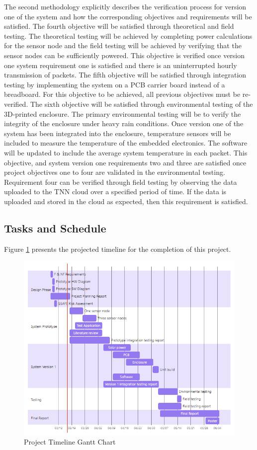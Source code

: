 The second methodology explicitly describes the verification process for version one of the system and how the corresponding objectives and requirements will be satisfied. The fourth objective will be satisfied through theoretical and field testing. The theoretical testing will be achieved by completing power calculations for the sensor node and the field testing will be achieved by verifying that the sensor nodes can be sufficiently powered. This objective is verified once version one system requirement one is satisfied and there is an uninterrupted hourly transmission of packets. The fifth objective will be satisfied through integration testing by implementing the system on a PCB carrier board instead of a breadboard. For this objective to be achieved, all previous objectives must be re-verified. The sixth objective will be satisfied through environmental testing of the 3D-printed enclosure. The primary environmental testing will be to verify the integrity of the enclosure under heavy rain conditions. Once version one of the system has been integrated into the enclosure, temperature sensors will be included to measure the temperature of the embedded electronics. The software will be updated to include the average system temperature in each packet. This objective, and system version one requirements two and three are satisfied once project objectives one to four are validated in the environmental testing. Requirement four can be verified through field testing by observing the data uploaded to the TNN cloud over a specified period of time. If the data is uploaded and stored in the cloud as expected, then this requirement is satisfied. 

\clearpage
\subsection{Tasks and Schedule}
Figure \ref{fig:GanttChart} presents the projected timeline for the completion of this project.

\begin{figure}[h!]
\center
\includegraphics[scale=0.95, angle=90, origin=c]{Images/Gantt-chart.png}
\caption{Project Timeline Gantt Chart}
\label{fig:GanttChart}
\end{figure}

